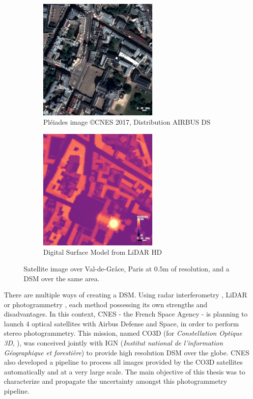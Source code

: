 \begin{figure}
    \centering
    \begin{subfigure}[t]{0.5\linewidth}
        \centering
        \includegraphics[height=6cm]{Images/0_Intro/Paris_Ortho.png}
        \caption{Pléiades image \copyright CNES 2017, Distribution AIRBUS DS}
        \label{fig:VDG_ortho}
    \end{subfigure}\hfill
    \begin{subfigure}[t]{0.5\linewidth}
        \centering
        \includegraphics[height=6cm]{Images/0_Intro/Paris_DSM.png}
        \caption{Digital Surface Model from LiDAR HD}
        \label{fig:VDG_dsm}
    \end{subfigure}
    \caption{Satellite image over Val-de-Grâce, Paris at $0.5$m of resolution, and a DSM over the same area.}
    \label{fig:intro_dsm_example}
\end{figure}

There are multiple ways of creating a DSM. Using radar interferometry \cite{farr_shuttle_2007}, LiDAR \cite{khosravipour_generating_2016} or photogrammetry \cite{tao_comprehensive_2001}, each method possessing its own strengths and disadvantages. In this context, CNES - the French Space Agency - is planning to launch 4 optical satellites with Airbus Defense and Space, in order to perform stereo photogrammetry. This mission, named CO3D (for \textit{Constellation Optique 3D}, \cite{melet_co3d_2020}), was conceived jointly with IGN (\textit{Institut national de l'information Géographique et forestière}) to provide high resolution DSM over the globe. CNES also developed a pipeline to process all images provided by the CO3D satellites automatically and at a very large scale. The main objective of this thesis was to characterize and propagate the uncertainty amongst this photogrammetry pipeline.

